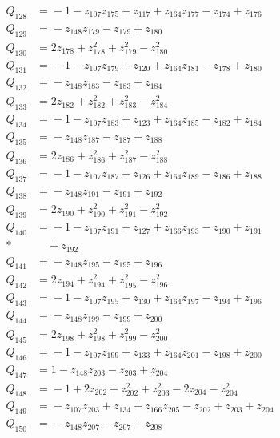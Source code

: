 \begin{align*}
Q_{128} &={}-1 - z_{107}z_{175} + z_{117} + z_{164}z_{177} - z_{174} + z_{176}\\[4pt]
Q_{129} &={}-z_{148}z_{179} - z_{179} + z_{180}\\[4pt]
Q_{130} &={}2z_{178} + z_{178}^{2} + z_{179}^{2} - z_{180}^{2}\\[4pt]
Q_{131} &={}-1 - z_{107}z_{179} + z_{120} + z_{164}z_{181} - z_{178} + z_{180}\\[4pt]
Q_{132} &={}-z_{148}z_{183} - z_{183} + z_{184}\\[4pt]
Q_{133} &={}2z_{182} + z_{182}^{2} + z_{183}^{2} - z_{184}^{2}\\[4pt]
Q_{134} &={}-1 - z_{107}z_{183} + z_{123} + z_{164}z_{185} - z_{182} + z_{184}\\[4pt]
Q_{135} &={}-z_{148}z_{187} - z_{187} + z_{188}\\[4pt]
Q_{136} &={}2z_{186} + z_{186}^{2} + z_{187}^{2} - z_{188}^{2}\\[4pt]
Q_{137} &={}-1 - z_{107}z_{187} + z_{126} + z_{164}z_{189} - z_{186} + z_{188}\\[4pt]
Q_{138} &={}-z_{148}z_{191} - z_{191} + z_{192}\\[4pt]
Q_{139} &={}2z_{190} + z_{190}^{2} + z_{191}^{2} - z_{192}^{2}\\[4pt]
Q_{140} &={}-1 - z_{107}z_{191} + z_{127} + z_{166}z_{193} - z_{190} + z_{191}\\*
&\quad{} + z_{192}\\[4pt]
Q_{141} &={}-z_{148}z_{195} - z_{195} + z_{196}\\[4pt]
Q_{142} &={}2z_{194} + z_{194}^{2} + z_{195}^{2} - z_{196}^{2}\\[4pt]
Q_{143} &={}-1 - z_{107}z_{195} + z_{130} + z_{164}z_{197} - z_{194} + z_{196}\\[4pt]
Q_{144} &={}-z_{148}z_{199} - z_{199} + z_{200}\\[4pt]
Q_{145} &={}2z_{198} + z_{198}^{2} + z_{199}^{2} - z_{200}^{2}\\[4pt]
Q_{146} &={}-1 - z_{107}z_{199} + z_{133} + z_{164}z_{201} - z_{198} + z_{200}\\[4pt]
Q_{147} &={}1 - z_{148}z_{203} - z_{203} + z_{204}\\[4pt]
Q_{148} &={}-1 + 2z_{202} + z_{202}^{2} + z_{203}^{2} - 2z_{204} - z_{204}^{2}\\[4pt]
Q_{149} &={}-z_{107}z_{203} + z_{134} + z_{166}z_{205} - z_{202} + z_{203} + z_{204}\\[4pt]
Q_{150} &={}-z_{148}z_{207} - z_{207} + z_{208}\\[4pt]

\end{align*}
